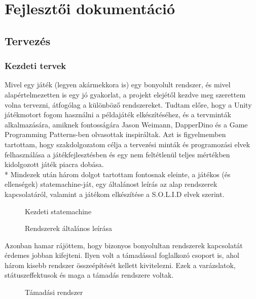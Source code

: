 \chapter{Fejlesztői dokumentáció} %
\label{ch:impl}

\section{Tervezés}

\subsection{Kezdeti tervek}
Mivel egy játék (legyen akármekkora is) egy bonyolult rendszer, és mivel alapértelmezetten is egy jó gyakorlat, a projekt elejétől kezdve meg szerettem volna tervezni, átfogólag a különböző rendszereket. Tudtam előre, hogy a Unity játékmotort fogom használni a példajáték elkészítéséhez, és a tervminták alkalmazására, amiknek fontosságára Jason Weimann\cite{jason}, DapperDino\cite{dapperDino} és a Game Programming Patterns-ben\cite{gameProgrammingPatterns} olvasottak inspiráltak. Azt is figyelmemben tartottam, hogy szakdolgozatom célja a tervezési minták és programozási elvek felhasználása a játékfejlesztésben és egy nem feltétlenül teljes mértékben kidolgozott játék piacra dobása.\\*
Mindezek után három dolgot tartottam fontosnak eleinte, a játékos (és ellenségek) statemachine-ját, egy általánost leírás az alap rendszerek kapcsolatáról, valamint a játékom elkészítése a S.O.L.I.D elvek szerint.
\begin{figure}[H]
	\noindent{}
	\caption{Kezdeti statemachine}
	\label{statemachine}
\end{figure}

\begin{figure}[H]
	\noindent{}
	\caption{Rendszerek általános leírása}
	\label{statussys}
\end{figure}

Azonban hamar rájöttem, hogy bizonyos bonyolultan rendszerek kapcsolatát érdemes jobban kifejteni. Ilyen volt a támadással foglalkozó csoport is, ahol három kisebb rendszer összeépítését kellett kivitelezni. Ezek a varázslatok, státuszeffektusok és maga a támadás rendszere voltak.

\begin{figure}[H]
	\noindent{}
	\caption{Támadási rendszer}
	\label{all}
\end{figure}

